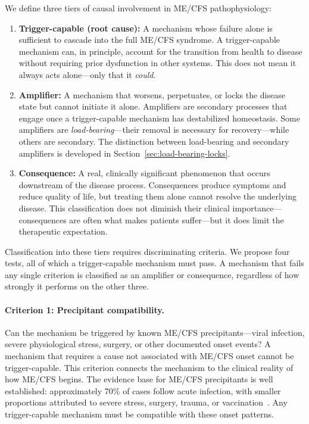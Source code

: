 \begin{observation}
\label{obs:three-tier}
We define three tiers of causal involvement in ME/CFS pathophysiology:

\begin{enumerate}
    \item \textbf{Trigger-capable (root cause):} A mechanism whose failure alone is sufficient to cascade into the full ME/CFS syndrome. A trigger-capable mechanism can, in principle, account for the transition from health to disease without requiring prior dysfunction in other systems. This does not mean it always acts alone---only that it \emph{could}.

    \item \textbf{Amplifier:} A mechanism that worsens, perpetuates, or locks the disease state but cannot initiate it alone. Amplifiers are secondary processes that engage once a trigger-capable mechanism has destabilized homeostasis. Some amplifiers are \emph{load-bearing}---their removal is necessary for recovery---while others are secondary. The distinction between load-bearing and secondary amplifiers is developed in Section~\ref{sec:load-bearing-locks}.

    \item \textbf{Consequence:} A real, clinically significant phenomenon that occurs downstream of the disease process. Consequences produce symptoms and reduce quality of life, but treating them alone cannot resolve the underlying disease. This classification does not diminish their clinical importance---consequences are often what makes patients suffer---but it does limit the therapeutic expectation.
\end{enumerate}
\end{observation}

Classification into these tiers requires discriminating criteria. We propose four tests, all of which a trigger-capable mechanism must pass. A mechanism that fails any single criterion is classified as an amplifier or consequence, regardless of how strongly it performs on the other three.

\paragraph{Criterion 1: Precipitant compatibility.} Can the mechanism be triggered by known ME/CFS precipitants---viral infection, severe physiological stress, surgery, or other documented onset events? A mechanism that requires a cause not associated with ME/CFS onset cannot be trigger-capable. This criterion connects the mechanism to the clinical reality of how ME/CFS begins. The evidence base for ME/CFS precipitants is well established: approximately 70\% of cases follow acute infection, with smaller proportions attributed to severe stress, surgery, trauma, or vaccination~\cite{Chu2019,Hickie2006postinfectious}. Any trigger-capable mechanism must be compatible with these onset patterns.

